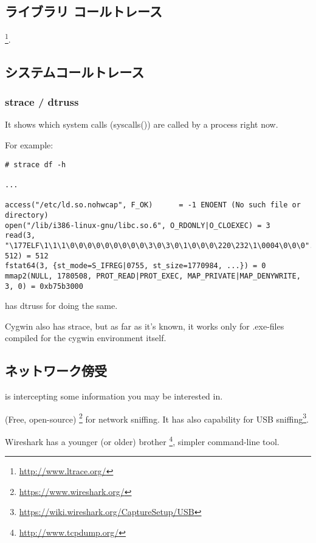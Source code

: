 \subsection{ライブラリ コールトレース}

\footnote{\url{http://www.ltrace.org/}}.

\subsection{システムコールトレース}

\label{strace}
\subsubsection{strace / dtruss}

It shows which system calls (syscalls()) are called by a process right now.

For example:

\begin{lstlisting}
# strace df -h

...

access("/etc/ld.so.nohwcap", F_OK)      = -1 ENOENT (No such file or directory)
open("/lib/i386-linux-gnu/libc.so.6", O_RDONLY|O_CLOEXEC) = 3
read(3, "\177ELF\1\1\1\0\0\0\0\0\0\0\0\0\3\0\3\0\1\0\0\0\220\232\1\0004\0\0\0"..., 512) = 512
fstat64(3, {st_mode=S_IFREG|0755, st_size=1770984, ...}) = 0
mmap2(NULL, 1780508, PROT_READ|PROT_EXEC, MAP_PRIVATE|MAP_DENYWRITE, 3, 0) = 0xb75b3000
\end{lstlisting}

\myindex{\MacOSX}
\MacOSX has dtruss for doing the same.

Cygwin also has strace, but as far as it's known, it works only for .exe-files
compiled for the cygwin environment itself.

\subsection{ネットワーク傍受}

 is intercepting some information you may be interested in.

(Free, open-source) \footnote{\url{https://www.wireshark.org/}} for network sniffing.
It has also capability for USB sniffing\footnote{\url{https://wiki.wireshark.org/CaptureSetup/USB}}.

Wireshark has a younger (or older) brother \footnote{\url{http://www.tcpdump.org/}}, simpler command-line tool.

